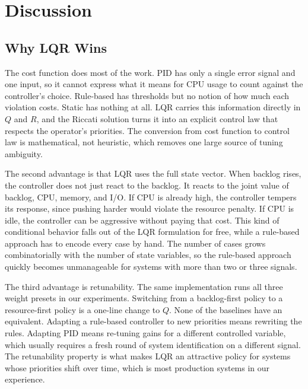 \documentclass[10pt,a4paper]{article}
\begin{document}
\section{Discussion}

\subsection{Why LQR Wins}

The cost function does most of the work. PID has only a single error signal and one input, so it cannot express what it means for CPU usage to count against the controller's choice. Rule-based has thresholds but no notion of how much each violation costs. Static has nothing at all. LQR carries this information directly in $Q$ and $R$, and the Riccati solution turns it into an explicit control law that respects the operator's priorities. The conversion from cost function to control law is mathematical, not heuristic, which removes one large source of tuning ambiguity.

The second advantage is that LQR uses the full state vector. When backlog rises, the controller does not just react to the backlog. It reacts to the joint value of backlog, CPU, memory, and I/O. If CPU is already high, the controller tempers its response, since pushing harder would violate the resource penalty. If CPU is idle, the controller can be aggressive without paying that cost. This kind of conditional behavior falls out of the LQR formulation for free, while a rule-based approach has to encode every case by hand. The number of cases grows combinatorially with the number of state variables, so the rule-based approach quickly becomes unmanageable for systems with more than two or three signals.

The third advantage is retunability. The same implementation runs all three weight presets in our experiments. Switching from a backlog-first policy to a resource-first policy is a one-line change to $Q$. None of the baselines have an equivalent. Adapting a rule-based controller to new priorities means rewriting the rules. Adapting PID means re-tuning gains for a different controlled variable, which usually requires a fresh round of system identification on a different signal. The retunability property is what makes LQR an attractive policy for systems whose priorities shift over time, which is most production systems in our experience.
\end{document}
